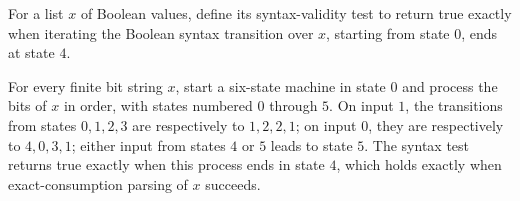 \begin{definition}
\label{Std.Sat.CNF.syntaxOK}
\leanok
{}
For a list $x$ of Boolean values, define its syntax-validity test to return true exactly
when iterating the Boolean syntax transition over $x$, starting from state $0$, ends at
state $4$.
\end{definition}

\begin{theorem}
\label{Std.Sat.CNF.syntaxOK_spec}
\leanok
{}
For every finite bit string $x$, start a six-state machine in state $0$ and process the
bits of $x$ in order, with states numbered $0$ through $5$. On input $1$, the
transitions from states $0,1,2,3$ are respectively to $1,2,2,1$; on input $0$, they are
respectively to $4,0,3,1$; either input from states $4$ or $5$ leads to state $5$. The
syntax test returns true exactly when this process ends in state $4$, which holds
exactly when exact-consumption parsing of $x$ succeeds.
\end{theorem}
